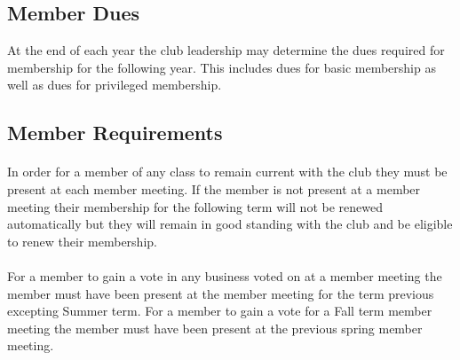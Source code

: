 \documentclass[12pt]{article}
\begin{document}




%
%
\subsection{Member Dues}
At the end of each year the club leadership may determine the dues required for membership for the following year.
This includes dues for basic membership as well as dues for privileged membership.



\subsection{Member Requirements}
\paragraph{}
In order for a member of any class to remain current with the club they must be present at each member
meeting. If the member is not present at a member meeting their membership for the following term 
will not be renewed automatically but they will remain in good standing with the club and be 
eligible to renew their membership.

\paragraph{}
For a member to gain a vote in any business voted on at a member meeting the member must have been 
present at the member meeting for the term previous excepting Summer term. For a member to gain a 
vote for a Fall term member meeting the member must have been present at the previous spring member
meeting. 
\end{document}
